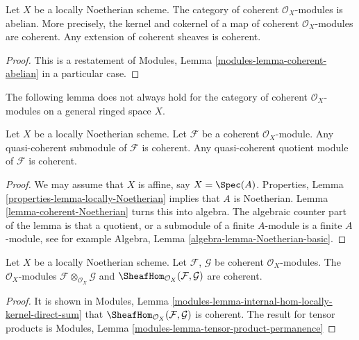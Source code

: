 \begin{lemma}
\label{lemma-coherent-abelian-Noetherian}
Let $X$ be a locally Noetherian scheme.
The category of coherent $\mathcal{O}_X$-modules is abelian.
More precisely, the kernel and cokernel of a map of coherent
$\mathcal{O}_X$-modules are coherent. Any extension
of coherent sheaves is coherent.
\end{lemma}

\begin{proof}
This is a restatement of
Modules, Lemma \ref{modules-lemma-coherent-abelian}
in a particular case.
\end{proof}

\noindent
The following lemma does not always hold for the category of coherent
$\mathcal{O}_X$-modules on a general ringed space $X$.

\begin{lemma}
\label{lemma-coherent-Noetherian-quasi-coherent-sub-quotient}
Let $X$ be a locally Noetherian scheme.
Let $\mathcal{F}$ be a coherent $\mathcal{O}_X$-module.
Any quasi-coherent submodule of $\mathcal{F}$ is coherent.
Any quasi-coherent quotient module of $\mathcal{F}$ is coherent.
\end{lemma}

\begin{proof}
We may assume that $X$ is affine, say $X = \Spec(A)$.
Properties, Lemma \ref{properties-lemma-locally-Noetherian}
implies that $A$ is Noetherian. Lemma \ref{lemma-coherent-Noetherian}
turns this into algebra. The algebraic counter part of
the lemma is that a quotient, or a submodule of a finite $A$-module
is a finite $A$-module, see for example
Algebra, Lemma \ref{algebra-lemma-Noetherian-basic}.
\end{proof}

\begin{lemma}
\label{lemma-tensor-hom-coherent}
Let $X$ be a locally Noetherian scheme.
Let $\mathcal{F}$, $\mathcal{G}$ be coherent $\mathcal{O}_X$-modules.
The $\mathcal{O}_X$-modules $\mathcal{F} \otimes_{\mathcal{O}_X} \mathcal{G}$
and $\SheafHom_{\mathcal{O}_X}(\mathcal{F}, \mathcal{G})$ are
coherent.
\end{lemma}

\begin{proof}
It is shown in
Modules, Lemma \ref{modules-lemma-internal-hom-locally-kernel-direct-sum} that
$\SheafHom_{\mathcal{O}_X}(\mathcal{F}, \mathcal{G})$ is coherent.
The result for tensor products is
Modules, Lemma \ref{modules-lemma-tensor-product-permanence}
\end{proof}

